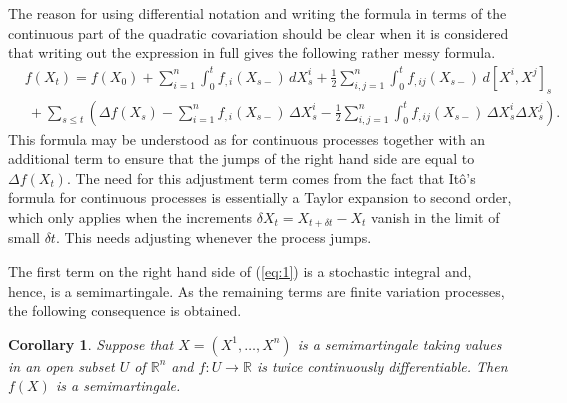 \documentclass[12pt]{article}
\newtheorem*{corollary*}{Corollary}
\begin{document}
The reason for using differential notation and writing the formula in terms of the continuous part of the quadratic covariation should be clear when it is considered that writing out the expression in full gives the following rather messy formula.
\begin{equation*}\begin{split}
&f(X_t)=f(X_0)+\sum_{i=1}^n \int_0^tf_{,i}(X_{s-})\,dX^i_s + \frac{1}{2}\sum_{i,j=1}^n\int_0^tf_{,ij}(X_{s-})\,d[X^i,X^j]_s\\
&\ + \sum_{s\le t}\left(\Delta f(X_s)-\sum_{i=1}^n f_{,i}(X_{s-})\,\Delta X^i_s-\frac{1}{2}\sum_{i,j=1}^n\int_0^tf_{,ij}(X_{s-})\,\Delta X^i_s\Delta X^j_s\right).
\end{split}\end{equation*}
This formula may be understood as  for continuous processes together with an additional term to ensure that the jumps of the right hand side are equal to $\Delta f(X_t)$. The need for this adjustment term comes from the fact that It\^o's formula for continuous processes is essentially a Taylor expansion to second order, which only applies when the increments $\delta X_t=X_{t+\delta t}-X_t$ vanish in the limit of small $\delta t$. This needs adjusting whenever the process jumps.

The first term on the right hand side of (\ref{eq:1}) is a stochastic integral and, hence, is a semimartingale. As the remaining terms are finite variation processes, the following consequence is obtained.

\begin{corollary*}
Suppose that $X=(X^1,\ldots,X^n)$ is a semimartingale taking values in an open subset $U$ of $\mathbb{R}^n$ and $f\colon U\rightarrow\mathbb{R}$ is twice continuously differentiable. Then $f(X)$ is a semimartingale.
\end{corollary*}

\end{document}
